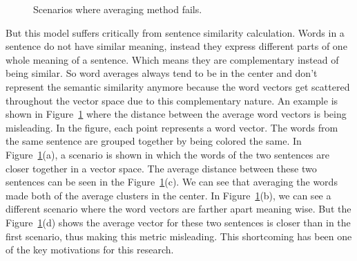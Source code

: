 \begin{figure}
    \centering
    
    \caption{Scenarios where averaging method fails.}
    \label{fig:sarkar-problem}
\end{figure}

But this model suffers critically from sentence similarity calculation.
Words in a sentence do not have similar meaning, instead they express different parts of one whole meaning of a sentence.
Which means they are complementary instead of being similar.
So word averages always tend to be in the center and don't represent the semantic similarity anymore because the word
vectors get scattered throughout the vector space due to this complementary nature.
An example is shown in Figure~\ref{fig:sarkar-problem} where the distance between the average word vectors is being
misleading.
In the figure, each point represents a word vector.
The words from the same sentence are grouped together by being colored the same.
In Figure~\ref{fig:sarkar-problem}(a), a scenario is shown in which the words of the two sentences are closer
together in a vector space.
The average distance between these two sentences can be seen in the Figure~\ref{fig:sarkar-problem}(c).
We can see that averaging the words made both of the average clusters in the center.
In Figure~\ref{fig:sarkar-problem}(b), we can see a different scenario where the word vectors are farther apart meaning wise.
But the Figure~\ref{fig:sarkar-problem}(d) shows the average vector for these two sentences is closer than in the first
scenario, thus making this metric misleading.
This shortcoming has been one of the key motivations for this research.